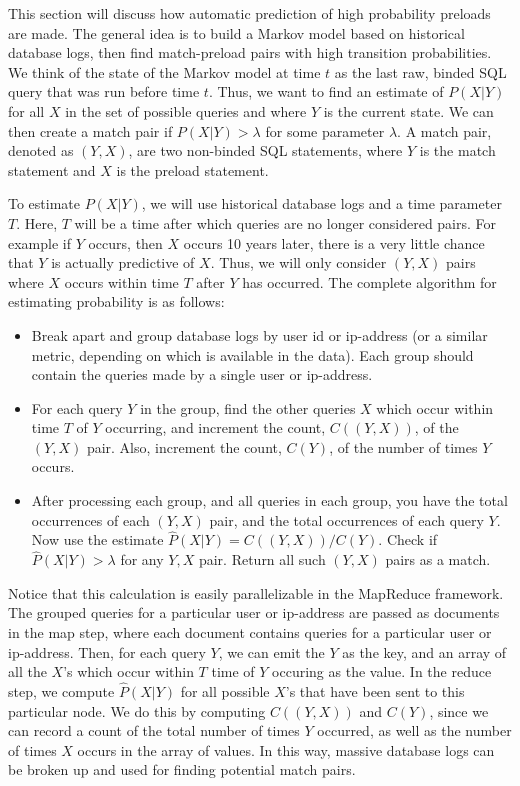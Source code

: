 \documentclass[12pt]{article}
\begin{document}
This section will discuss how automatic prediction of high probability preloads are made. The general idea is to build a Markov model based on historical database logs, then find match-preload pairs with high transition probabilities. We think of the state of the Markov model at time $t$ as the last raw, binded SQL query that was run before time $t$. Thus, we want to find an estimate of $P(X | Y)$ for all $X$ in the set of possible queries and where $Y$ is the current state. We can then create a match pair if $P(X | Y) > \lambda$ for some parameter $\lambda$. A match pair, denoted as $(Y, X)$, are two non-binded SQL statements, where $Y$ is the match statement and $X$ is the preload statement.

To estimate $P(X | Y)$, we will use historical database logs and a time parameter $T$. Here, $T$ will be a time after which queries are no longer considered pairs. For example if $Y$ occurs, then $X$ occurs 10 years later, there is a very little chance that $Y$ is actually predictive of $X$. Thus, we will only consider $(Y, X)$ pairs where $X$ occurs within time $T$ after $Y$ has occurred. The complete algorithm for estimating probability is as follows:

\begin{itemize}
  \item Break apart and group database logs by user id or ip-address (or a similar metric, depending on which is available in the data). Each group should contain the queries made by a single user or ip-address.
  \item For each query $Y$ in the group, find the other queries $X$ which occur within time $T$ of $Y$ occurring, and increment the count, $C((Y,X))$, of the $(Y,X)$ pair. Also, increment the count, $C(Y)$, of the number of times $Y$ occurs.
  \item After processing each group, and all queries in each group, you have the total occurrences of each $(Y,X)$ pair, and the total occurrences of each query $Y$. Now use the estimate $\hat{P}(X | Y) = C((Y,X))/C(Y)$. Check if $\hat{P}(X | Y) > \lambda$ for any $Y, X$ pair. Return all such $(Y, X)$ pairs as a match.
\end{itemize}

Notice that this calculation is easily parallelizable in the MapReduce framework. The grouped queries for a particular user or ip-address are passed as documents in the map step, where each document contains queries for a particular user or ip-address. Then, for each query $Y$, we can emit the $Y$ as the key, and an array of all the $X$'s which occur within $T$ time of $Y$ occuring as the value. In the reduce step, we compute $\hat{P}(X | Y)$ for all possible $X$'s that have been sent to this particular node. We do this by computing $C((Y,X))$ and $C(Y)$, since we can record a count of the total number of times $Y$ occurred, as well as the number of times $X$ occurs in the array of values. In this way, massive database logs can be broken up and used for finding potential match pairs.
\end{document}
